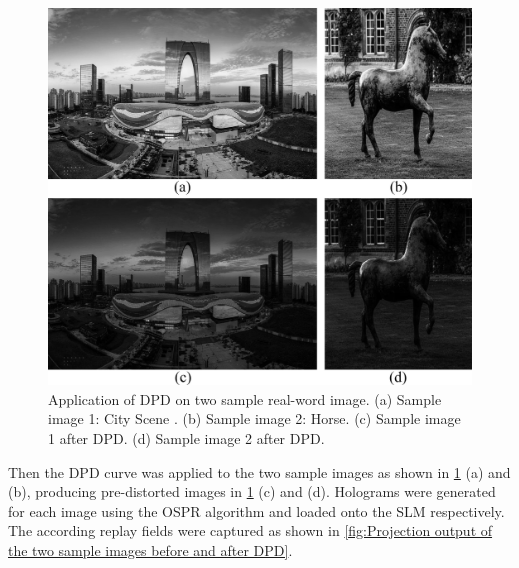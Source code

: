 \begin{figure}[H]
    \centering
    \includegraphics[width=\textwidth]{Application_of_DPD_on_two_sample_real-word_images.jpg}
    \caption{Application of DPD on two sample real-word image. (a) Sample image 1: City Scene \cite{Zhao2017}. (b) Sample image 2: Horse. (c) Sample image 1 after DPD. (d) Sample image 2 after DPD.}
    \label{fig:Application of DPD on two sample real-word image}
\end{figure}
\vspace{3mm}

Then the DPD curve was applied to the two sample images as shown in \cref{fig:Application of DPD on two sample real-word image} (a) and (b), producing pre-distorted images in \cref{fig:Application of DPD on two sample real-word image} (c) and (d). Holograms were generated for each image using the OSPR algorithm and loaded onto the SLM respectively. The according replay fields were captured as shown in \cref{fig:Projection output of the two sample images before and after DPD}.

